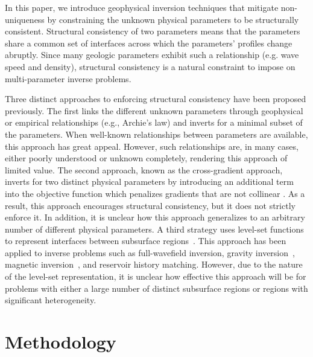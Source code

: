 \documentclass[manuscript,revised]{geophysics}
\begin{document}
In this paper, we introduce geophysical inversion techniques that mitigate non-uniqueness by constraining the unknown physical parameters to be structurally consistent.  Structural consistency of two parameters means that the parameters share a common set of interfaces across which the parameters' profiles  change abruptly.  Since many geologic parameters exhibit such a relationship (e.g. wave speed and density), structural consistency is a natural constraint to impose on multi-parameter inverse problems.  

Three distinct approaches to enforcing structural consistency have been proposed previously.  The first links the different unknown parameters through geophysical or empirical relationships (e.g., Archie’s law) and inverts for a minimal subset of the parameters. When well-known relationships between parameters are available, this approach has great appeal. However, such relationships are, in many cases, either poorly understood or unknown completely, rendering this approach of limited value.  The second approach, known as the cross-gradient approach, inverts for two distinct physical parameters by introducing an additional term into the objective function which penalizes gradients that are not collinear \cite[]{Haber_1997,Gallardo_2007}. As a result, this approach encourages structural consistency, but it does not strictly enforce it. In addition, it is unclear how this approach generalizes to an arbitrary number of different physical parameters. 
A third strategy uses level-set functions to represent interfaces between subsurface regions~\cite[]{Kadu_2016}. This approach has been applied to inverse problems such as full-wavefield inversion, gravity inversion~\cite[]{Li_2016}, magnetic inversion~\cite[]{Li_2017}, and reservoir history matching. However, due to the nature of the level-set representation, it is unclear how effective this approach will be for problems with either a large number of distinct subsurface regions or regions with significant heterogeneity. 

\section{Methodology}
\end{document}
